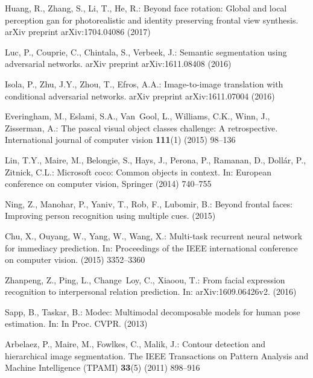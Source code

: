 \documentclass[10pt, letterpaper]{article}
\begin{document}
\begin{thebibliography}{10}
Huang, R., Zhang, S., Li, T., He, R.:
\newblock Beyond face rotation: Global and local perception gan for
  photorealistic and identity preserving frontal view synthesis.
\newblock arXiv preprint arXiv:1704.04086 (2017)

Luc, P., Couprie, C., Chintala, S., Verbeek, J.:
\newblock Semantic segmentation using adversarial networks.
\newblock arXiv preprint arXiv:1611.08408 (2016)

Isola, P., Zhu, J.Y., Zhou, T., Efros, A.A.:
\newblock Image-to-image translation with conditional adversarial networks.
\newblock arXiv preprint arXiv:1611.07004 (2016)

Everingham, M., Eslami, S.A., Van~Gool, L., Williams, C.K., Winn, J.,
  Zisserman, A.:
\newblock The pascal visual object classes challenge: A retrospective.
\newblock International journal of computer vision \textbf{111}(1) (2015)
  98--136

Lin, T.Y., Maire, M., Belongie, S., Hays, J., Perona, P., Ramanan, D.,
  Doll{\'a}r, P., Zitnick, C.L.:
\newblock Microsoft coco: Common objects in context.
\newblock In: European conference on computer vision, Springer (2014)  740--755

Ning, Z., Manohar, P., Yaniv, T., Rob, F., Lubomir, B.:
\newblock Beyond frontal faces: Improving person recognition using multiple
  cues.
\newblock (2015)

Chu, X., Ouyang, W., Yang, W., Wang, X.:
\newblock Multi-task recurrent neural network for immediacy prediction.
\newblock In: Proceedings of the IEEE international conference on computer
  vision. (2015)  3352--3360

Zhanpeng, Z., Ping, L., Change~Loy, C., Xiaoou, T.:
\newblock From facial expression recognition to interpersonal relation
  prediction.
\newblock In: arXiv:1609.06426v2. (2016)

Sapp, B., Taskar, B.:
\newblock Modec: Multimodal decomposable models for human pose estimation.
\newblock In: In Proc. CVPR. (2013)

Arbelaez, P., Maire, M., Fowlkes, C., Malik, J.:
\newblock Contour detection and hierarchical image segmentation.
\newblock The IEEE Transactions on Pattern Analysis and Machine Intelligence
  (TPAMI) \textbf{33}(5) (2011)  898--916


\end{thebibliography}
\end{document}
